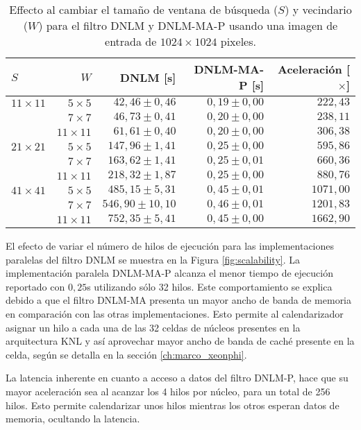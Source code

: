 \begin{table}[htb]
\protect\caption[Efecto al cambiar parámetros $S$ y $W$]{Effecto al cambiar el tama\~no de ventana de búsqueda ($S$) y vecindario ($W$) para el filtro DNLM y DNLM-MA-P usando una imagen de entrada de  $1024 \times 1024$ pixeles. \label{tabla:scala2}}
\centering
\begin{tabular}{lrrrr}
$S$  & $W$ & DNLM [s] & DNLM-MA-P [s]& Aceleración [$\times$]\tabularnewline
\hline
$11 \times 11$ & $5 \times 5$ & $42,46\pm0,46$ & $0,19\pm0,00$ & $222,43$ \tabularnewline
 & $7 \times 7$ & $46,73\pm0,41$ & $0,20\pm0,00$ & $238,11$ \tabularnewline
 & $11 \times 11$ & $61,61\pm0,40$ & $0,20\pm0,00$ & $306,38$ \tabularnewline
$21 \times 21$ & $5 \times 5$ & $147,96\pm1,41$ & $0,25\pm0,00$ & $595,86$ \tabularnewline
 & $7 \times 7$ & $163,62\pm1,41$ & $0,25\pm0,01$ & $660,36$ \tabularnewline
 & $11 \times 11$ & $218,32\pm1,87$ & $0,25\pm0,00$ & $880,76$ \tabularnewline
 $41 \times 41$ & $5 \times 5$ & $485,15\pm5,31$ & $0,45\pm0,01$ & $1071,00$ \tabularnewline
 & $7 \times 7$ & $546,90\pm10,10$ & $0,46\pm0,01$ & $1201,83$ \tabularnewline
 & $11 \times 11$ & $752,35\pm5,41$ & $0,45\pm0,00$ & $1662,90$ \tabularnewline
\end{tabular}
\end{table}




El efecto de variar el número de hilos de ejecución para las implementaciones paralelas del filtro DNLM se muestra en la Figura \ref{fig:scalability}. La implementación paralela DNLM-MA-P alcanza el menor tiempo de ejecución reportado con $0,25$s utilizando sólo 32 hilos. Este comportamiento se explica debido a que el filtro DNLM-MA presenta un mayor ancho de banda de memoria en comparación con las otras implementaciones. Esto permite al calendarizador asignar un hilo a cada una de las 32 celdas de núcleos presentes en la arquitectura  KNL y así aprovechar mayor ancho de banda de caché presente en la celda, según se detalla en la sección \ref{ch:marco_xeonphi}. 

La latencia inherente en cuanto a acceso a datos del filtro DNLM-P, hace que su mayor aceleraci\'on sea al acanzar los 4 hilos por n\'ucleo, para un total de 256 hilos. Esto permite calendarizar unos hilos mientras los otros esperan datos de memoria, ocultando la latencia.  



  
